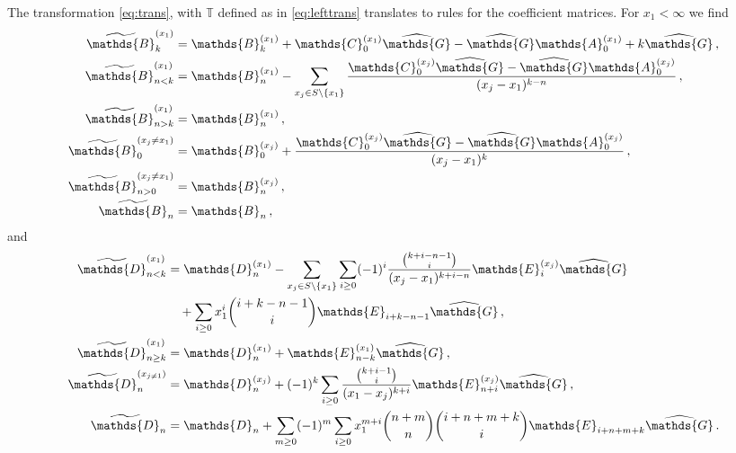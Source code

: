 \documentclass[12pt]{article}
\numberwithin{equation}{section}
\numberwithin{figure}{section}
\newcommand{\A}{\mathds{A}}
\newcommand{\B}{\mathds{B}}
\newcommand{\C}{\mathds{C}}
\newcommand{\D}{\mathds{D}}
\newcommand{\E}{\mathds{E}}
\newcommand{\G}{\mathds{G}}
\newcommand{\T}{\mathds{T}}
\begin{document}
      The transformation \eqref{eq:trans}, with $\T$ defined as in \eqref{eq:lefttrans} translates to rules for the coefficient matrices.
      For $x_1 < \infty$ we find
      \begin{subequations}
        \begin{align}
          \widetilde\B^{(x_1)}_k &= 
            \B^{(x_1)}_k
            + \C_0^{(x_1)}\widehat\G - \widehat\G\A_0^{(x_1)} 
            + k\widehat\G\,, \label{eq:offred_Bx1k}
          \\
          \widetilde\B^{(x_1)}_{n<k} &= 
            \B^{(x_1)}_n
            -\sum\limits_{x_j\in S \backslash\{x_1\}} 
            \frac{\C_0^{(x_j)}\widehat\G - \widehat\G\A_0^{(x_j)}}{(x_j-x_1)^{k-n}}\,,
          \\
          \widetilde\B^{(x_1)}_{n>k} &= 
            \B^{(x_1)}_n\,,
          \\
          \widetilde\B^{(x_j \neq x_1)}_0 &= 
            \B^{(x_j)}_0
            +
            \frac{\C_0^{(x_j)}\widehat\G - \widehat\G\A_0^{(x_j)}}{(x_j-x_1)^k}\,,
          \\
          \widetilde\B^{(x_j \neq x_1)}_{n>0} &= 
            \B^{(x_j)}_n\,,
          \\
          \widetilde\B_n &= 
            \B_n\,,
        \end{align}
      \end{subequations}        
      and
      \begin{align*}
        \widetilde\D^{(x_1)}_{n<k} &= 
          \D^{(x_1)}_n
          -
          \sum\limits_{x_j\in S\backslash\{x_1\}} 
          \sum\limits_{i\geq0}
          (-1)^i
          \frac{\binom{k+i-n-1}{i}}{(x_j-x_1)^{k+i-n}}
          \E^{(x_j)}_i\widehat\G \\ &\quad
          +
          \sum\limits_{i\geq0}
          x_1^i \binom{i+k-n-1}{i}
          \E_{i+k-n-1} \widehat\G\,,
          \\
        \widetilde\D^{(x_1)}_{n\geq k} &=
          \D^{(x_1)}_n
          + 
          \E^{(x_1)}_{n-k}\widehat\G\,, 
          \\
        \widetilde\D^{(x_{j\neq1})}_n &=
          \D^{(x_j)}_n
          +
          (-1)^k
          \sum\limits_{i\geq0}
          \frac{\binom{k+i-1}{i}}{(x_1-x_j)^{k+i}} 
          \E^{(x_j)}_{n+i}\widehat\G\,,
          \\
        \widetilde\D_n &=
          \D_n
          +
          \sum\limits_{m\geq0}
          (-1)^{m} 
          \sum\limits_{i\geq0}
          x_1^{m+i} 
          \binom{n+m}{n} 
          \binom{i+n+m+k}{i} 
          \E_{i+n+m+k} \widehat\G\,.
      \end{align*}
\end{document}

